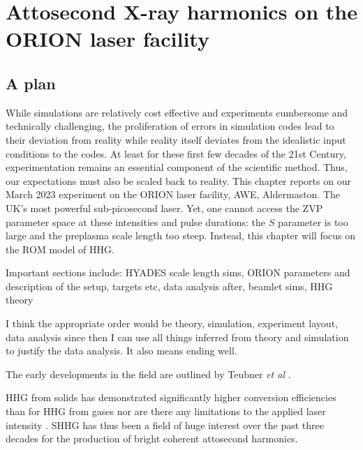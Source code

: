 \chapter{\label{ch:3-orion}Attosecond X-ray harmonics on the ORION laser facility} 

\minitoc

\section{A plan}

While simulations are relatively cost effective and experiments cumbersome and technically challenging, the proliferation of errors in simulation codes lead to their deviation from reality while reality itself deviates from the idealistic input conditions to the codes. At least for these first few decades of the 21st Century, experimentation remains an essential component of the scientific method. Thus, our expectations must also be scaled back to reality. This chapter reports on our March 2023 experiment on the ORION laser facility, AWE, Aldermaston. The UK's most powerful sub-picosecond laser. Yet, one cannot access the ZVP parameter space at these intensities and pulse durations: the $S$ parameter is too large and the preplasma scale length too steep. Instead, this chapter will focus on the ROM model of HHG. 

Important sections include:
HYADES scale length sims, ORION parameters and description of the setup, targets etc, data analysis after, beamlet sims, HHG theory


I think the appropriate order would be theory, simulation, experiment layout, data analysis since then I can use all things inferred from theory and simulation to justify the data analysis. It also means ending well.

The early developments in the field are outlined by Teubner \textit{et al} \cite{teubnerHighorderHarmonicsLaserirradiated2009}.


HHG from solids has demonstrated significantly higher conversion efficiencies than for HHG from gases nor are there any limitations to the applied laser intensity \cite{teubnerHighorderHarmonicsLaserirradiated2009}. SHHG has thus been a field of huge interest over the past three decades for the production of bright coherent attosecond harmonics.



